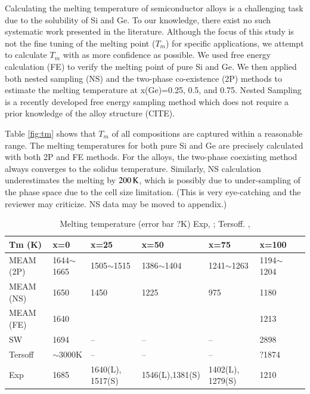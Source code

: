 \documentclass[review]{elsarticle}
\begin{document}
Calculating the melting temperature of semiconductor alloys is a challenging task due to the solubility of Si and Ge. To our knowledge, there exist no such systematic work presented in the literature. Although the focus of this study is not the fine tuning of the melting point ($T_m$) for specific applications, we attempt to calculate $T_m$ with as more confidence as possible. We used free energy calculation (FE) \cite{ryu2008comparison}  to verify the melting point of pure Si and Ge. We then applied both nested sampling (NS) and the two-phase co-existence (2P) methods to estimate the melting temperature at x(Ge)=0.25, 0.5, and 0.75. Nested Sampling is a recently developed free energy sampling method which does not require a prior knowledge of the alloy structure (CITE).

Table \ref{fig:tm} shows that $T_m$ of all compositions are captured within a reasonable range. The melting temperatures for both pure Si and Ge are precisely calculated with both 2P and FE methods. For the alloys, the two-phase coexisting method always converges to the solidus temperature. Similarly, NS calculation underestimates the melting by $\rm 200\,K$, which is possibly due to under-sampling of the phase space due to the cell size limitation. ({\color{red}This is very eye-catching and the reviewer may criticize. NS data may be moved to appendix.})

\begin{table}[H]
\centering
\caption{Melting temperature (error bar ?K) Exp, \cite{johnson1954some}; Tersoff. \cite{tersoff1988empirical},\cite{cook1993comparison}}
\label{tab:tm}
\begin{tabular}{lllllll}
\hline
Tm   (K)& x=0 & x=25 & x=50 & x=75 & x=100 &  \\ \hline
MEAM  (2P)   & 1644$\sim$1665    & 1505$\sim$1515      & 1386$\sim$1404      & 1241$\sim$1263    &  1194$\sim$ 1204 \\ 
MEAM  (NS)   & 1650   &  1450    &  1225    &  975  & 1180  \\
MEAM  (FE)   & 1640   &          &          &         & 1213  \\
SW      &   1694  &  --    &   --  &  --    &  2898 \\ 
Tersoff &  $\sim$3000K   &   --   &   --    &    --  &  $?$1874  \\ 
Exp     &  1685  &  1640(L), 1517(S)    & 1546(L),1381(S)   & 1402(L), 1279(S)     & 1210 \\ \hline
\end{tabular}
\end{table}
\end{document}
